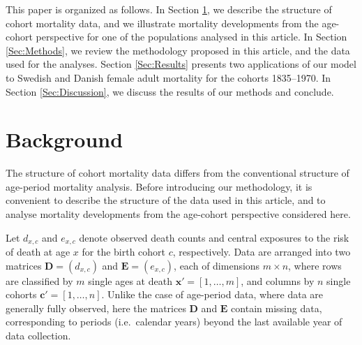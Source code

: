 \documentclass[11pt, a4paper]{article}
\begin{document}
This paper is organized as follows. In Section \ref{Sec:Background}, we describe the structure of cohort mortality data, and we illustrate mortality developments from the age-cohort perspective for one of the populations analysed in this article. In Section \ref{Sec:Methods}, we review the methodology proposed in this article, and the data used for the analyses. Section \ref{Sec:Results} presents two applications of our model to Swedish and Danish female adult mortality for the cohorts 1835--1970. In Section \ref{Sec:Discussion}, we discuss the results of our methods and conclude. 

\section{Background}
\label{Sec:Background}

The structure of cohort mortality data differs from the conventional structure of age-period mortality analysis. Before introducing our methodology, it is convenient to describe the structure of the data used in this article, and to analyse mortality developments from the age-cohort perspective considered here.   

Let $d_{x,c}$ and $e_{x,c}$ denote observed death counts and central exposures to the risk of death at age $x$ for the birth cohort $c$, respectively. Data are arranged into two matrices $\bm{D} = (d_{x,c})$ and $\bm{E} = (e_{x,c})$, each of dimensions $m \times n$, where rows are classified by $m$ single ages at death $\bm{x}'=\left[1,\dots,m\right]$, and columns by $n$ single cohorts $\bm{c}'=\left[1,\dots,n\right]$. Unlike the case of age-period data, where data are generally fully observed, here the matrices $\bm{D}$ and $\bm{E}$ contain missing data, corresponding to periods (i.e.~calendar years) beyond the last available year of data collection. 
\end{document}
